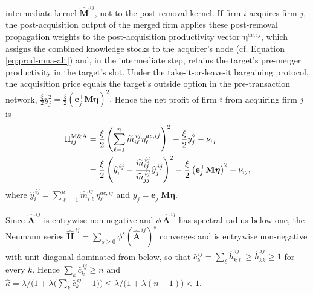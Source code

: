 intermediate kernel $\widehat{\mathbf{M}}^{\,ij}$, not to the post-removal kernel. If firm $i$ acquires firm $j$, the post-acquisition output
of the merged firm applies these post-removal propagation weights to the
post-acquisition productivity vector $\bm{\eta}^{ac,ij}$, which assigns the combined knowledge stocks to the acquirer's node (cf. Equation \eqref{eq:prod-mna-alt}) and, in the intermediate step, retains the target's pre-merger productivity in the target's slot. Under the take-it-or-leave-it bargaining protocol, the acquisition price equals the target's outside option in the pre-transaction network,
$
\frac{\xi}{2}y_{j}^2
=
\frac{\xi}{2}
\left(
\mathbf{e}_j^{\top}\mathbf{M} \bm{\eta}
\right)^2.
$
Hence the net profit of firm $i$ from acquiring firm $j$ is
\begin{align}
\Pi_{ij}^{\text{M\&A}}
& =
\frac{\xi}{2}
\left(
\sum_{\ell=1}^n
\widetilde m_{i\ell}^{\,ij} \eta_{\ell}^{ac,ij}
\right)^2
-
\frac{\xi}{2}
y_j^2
-
\nu_{ij} \notag \\
& = \frac{\xi}{2}
\left(
\widehat y_i^{\,ij}
-
\frac{
\widehat m_{ij}^{\,ij}
}{
\widehat m_{jj}^{\,ij}
}
\widehat y_j^{\,ij}
\right)^2
-
\frac{\xi}{2}
\left(
\mathbf{e}_j^{\top}\mathbf{M}\bm{\eta}
\right)^2
-
\nu_{ij},
\label{eq:mna-form-profit}
\end{align}
where $\widehat y_{i}^{\,ij} = \sum_{\ell=1}^n \widehat m_{i\ell}^{\,ij} \eta_{\ell}^{ac,ij}$ and $y_j=\mathbf{e}_j^{\top}\mathbf{M}\bm{\eta}$.%

Since $\widehat{\mathbf{A}}^{\,ij}$ is entrywise non-negative and
$\phi\,\widehat{\mathbf{A}}^{\,ij}$ has spectral radius below one, the Neumann
series
$\widehat{\mathbf{H}}^{\,ij}=\sum_{s\ge 0}\phi^s(\widehat{\mathbf{A}}^{\,ij})^s$
converges and is entrywise non-negative with unit diagonal dominated from
below, so that
$\widehat c_k^{\,ij}=\sum_{\ell}\widehat h_{k\ell}^{\,ij}\ge \widehat
h_{kk}^{\,ij}\ge 1$ for every $k$. Hence
$\sum_k \widehat c_k^{\,ij}\ge n$ and
$\widehat\kappa
=\lambda/\big(1+\lambda\big(\sum_k \widehat c_k^{\,ij}-1\big)\big)
\le \lambda/\big(1+\lambda(n-1)\big)<1$.

